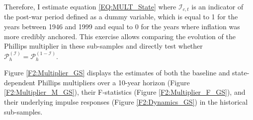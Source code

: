 \documentclass[12pt]{article}
\begin{document}
Therefore, I estimate equation \ref{EQ:MULT_State} where $\mathcal{I}_{c,t}$ is an indicator of the post-war period defined as a dummy variable, which is equal to 1 for the years between 1946 and 1999 and equal to 0 for the years where inflation was more credibly anchored. This exercise allows comparing the evolution of the Phillips multiplier in these sub-samples and directly test whether $\mathcal{P}_h^{(\mathcal{I})} = \mathcal{P}_h^{(1-\mathcal{I})}$.

Figure \ref{F2:Multiplier_GS} displays the estimates of both the baseline and state-dependent Phillips multipliers over a 10-year horizon (Figure \ref{F2:Multiplier_M_GS}), their F-statistics (Figure \ref{F2:Multiplier_F_GS}), and their underlying impulse responses (Figure \ref{F2:Dynamics_GS}) in the historical sub-samples.
\end{document}
